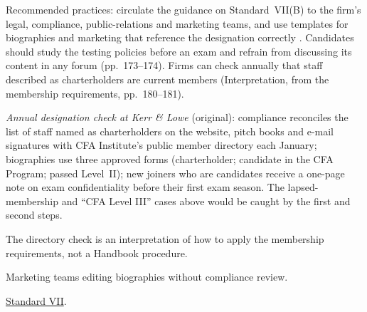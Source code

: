 \begin{qfmethod}\label{meth:preventing-member-violations}
 Recommended practices: circulate the guidance on Standard~VII(B) to the firm's legal, compliance, public-relations and marketing teams, and use templates for biographies and marketing that reference the designation correctly \citep[p.~183]{standards-practice-handbook-2024}. Candidates should study the testing policies before an exam and refrain from discussing its content in any forum (pp.~173--174). Firms can check annually that staff described as charterholders are current members (Interpretation, from the membership requirements, pp.~180--181).

 \emph{Annual designation check at Kerr \& Lowe} (original): compliance reconciles the list of staff named as charterholders on the website, pitch books and e-mail signatures with CFA Institute's public member directory each January; biographies use three approved forms (charterholder; candidate in the CFA Program; passed Level~II); new joiners who are candidates receive a one-page note on exam confidentiality before their first exam season. The lapsed-membership and ``CFA Level III'' cases above would be caught by the first and second steps.

 The directory check is an interpretation of how to apply the membership requirements, not a Handbook procedure.

 Marketing teams editing biographies without compliance review.

 \hyperref[rule:standard-member-responsibilities]{Standard VII}.

\end{qfmethod}
